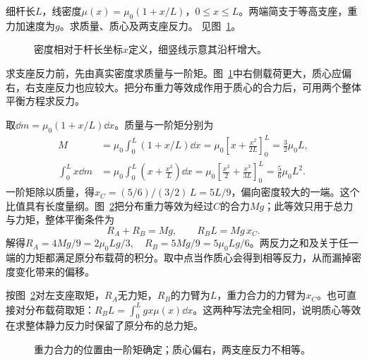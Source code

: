 \begin{exercise}[非均匀杆的质心与反力]\label{ex:c1-h9}
细杆长$L$，线密度$\mu(x)=\mu_0(1+x/L)$，$0\le x\le L$。两端简支于等高支座，重力加速度为$g$。求质量、质心及两支座反力。 见图~\ref{fig:c1-h9-q}。
\end{exercise}

\begin{figure}[H]\centering
{}
\caption{密度相对于杆长坐标$x$定义，细竖线示意其沿杆增大。}\label{fig:c1-h9-q}
\end{figure}
\begin{solution}
求支座反力前，先由真实密度求质量与一阶矩。图~\ref{fig:c1-h9-q}中右侧载荷更大，质心应偏右，右支座反力也应较大。把分布重力等效成作用于质心的合力后，可用两个整体平衡方程求反力。


取$\dd m=\mu_0(1+x/L)\dd x$。质量与一阶矩分别为
\[
\begin{aligned}
M&=\mu_0\int_0^L(1+x/L)\dd x
=\mu_0\left[x+\frac{x^2}{2L}\right]_0^L=\frac32\mu_0L,\\
\int_0^Lx\dd m&=\mu_0\int_0^L\left(x+\frac{x^2}{L}\right)\dd x
=\mu_0\left[\frac{x^2}{2}+\frac{x^3}{3L}\right]_0^L
=\frac56\mu_0L^2.
\end{aligned}
\]
一阶矩除以质量，得$\boxed{x_C=(5/6)/(3/2)\,L=5L/9}$，偏向密度较大的一端。这个比值具有长度量纲。图~\ref{fig:c1-h9-s}把分布重力等效为经过$C$的合力$Mg$；此等效只用于总力与力矩，整体平衡条件为
\[R_A+R_B=Mg,\qquad R_BL=Mg\,x_C.
\]
解得$\boxed{R_A=4Mg/9=2\mu_0Lg/3,\quad R_B=5Mg/9=5\mu_0Lg/6}$。两反力之和及关于任一端的力矩都满足原分布载荷的积分。取中点当作质心会得到相等反力，从而漏掉密度变化带来的偏移。


按图~\ref{fig:c1-h9-s}对左支座取矩，$R_A$无力矩，$R_B$的力臂为$L$，重力合力的力臂为$x_C$。也可直接对分布载荷取矩：$R_BL=\int_0^Lgx\mu(x)\dd x$。这两种写法完全相同，说明质心等效在求整体静力反力时保留了原分布的总力矩。

\begin{figure}[H]\centering
{}
\caption{重力合力的位置由一阶矩确定；质心偏右，两支座反力不相等。}\label{fig:c1-h9-s}
\end{figure}
\end{solution}

